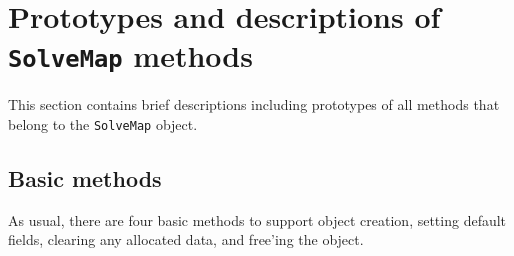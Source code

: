 \par
\section{Prototypes and descriptions of {\tt SolveMap} methods}
\label{section:SolveMap:proto}
\par
This section contains brief descriptions including prototypes
of all methods that belong to the {\tt SolveMap} object.
\par
\subsection{Basic methods}
\label{subsection:SolveMap:proto:basics}
\par
As usual, there are four basic methods to support object creation,
setting default fields, clearing any allocated data, and free'ing
the object.
\par
